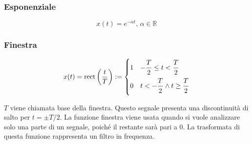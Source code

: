 \documentclass{article}
\newcommand{\rect}{\mathrm{rect}}
\numberwithin{equation}{subsection}
\begin{document}
\subsubsection{Esponenziale}

\begin{equation}
    x(t)=e^{-\alpha t},\,\alpha\in\mathbb{R}
\end{equation}

\begin{figure}[H]%
    \centering
    \qquad
\end{figure}

\subsubsection{Finestra}

\begin{equation}
    x(t)=\rect\left(\displaystyle\frac{t}{T}\right):=\begin{cases}
        1 & \displaystyle-\frac{\strut T}{\strut 2}\leq t <\frac{\strut T}{\strut 2}\\
        0 & \displaystyle t<-\frac{\strut T}{\strut 2} \land t\geq\frac{\strut T}{\strut 2}
    \end{cases}
\end{equation}

$T$ viene chiamata base della finestra. Questo segnale presenta una discontinuità di salto per $t=\pm T/2$. La funzione finestra viene usata quando si 
vuole analizzare solo una parte di un segnale, poiché il restante sarà pari a $0$. La trasformata di questa funzione rappresenta un filtro in frequenza. 
\end{document}
